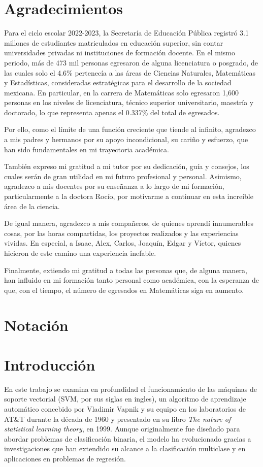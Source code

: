 \documentclass[letterpaper,12pt,oneside]{book}
\begin{document}
\chapter{Agradecimientos}
{Para el ciclo escolar 2022-2023, la Secretaría de Educación Pública registró 3.1 millones de estudiantes matriculados en educación superior, sin contar universidades privadas ni instituciones de formación docente. En el mismo periodo, más de 473 mil personas egresaron de alguna licenciatura o posgrado, de las cuales solo el 4.6\% pertenecía a las áreas de Ciencias Naturales, Matemáticas y Estadísticas, consideradas estratégicas para el desarrollo de la sociedad mexicana. En particular, en la carrera de Matemáticas solo egresaron 1,600 personas en los niveles de licenciatura, técnico superior universitario, maestría y doctorado, lo que representa apenas el 0.337\% del total de egresados.

Por ello, como el límite de una función creciente que tiende al infinito, agradezco a mis padres y hermanos por su apoyo incondicional, su cariño y esfuerzo, que han sido fundamentales en mi trayectoria académica.

También expreso mi gratitud a mi tutor por su dedicación, guía y consejos, los cuales serán de gran utilidad en mi futuro profesional y personal. Asimismo, agradezco a mis docentes por su enseñanza a lo largo de mi formación, particularmente a la doctora Rocío, por motivarme a continuar en esta increíble área de la ciencia.


De igual manera, agradezco a mis compañeros, de quienes aprendí innumerables cosas, por las horas compartidas, los proyectos realizados y las experiencias vividas. En especial, a Isaac, Alex, Carlos, Joaquín, Edgar y Víctor, quienes hicieron de este camino una experiencia inefable.


Finalmente, extiendo mi gratitud a todas las personas que, de alguna manera, han influido en mi formación tanto personal como académica, con la esperanza de que, con el tiempo, el número de egresados en Matemáticas siga en aumento.
}

\chapter{Notación}

\chapter{Introducción}
En este trabajo se examina en profundidad el funcionamiento de las máquinas de soporte vectorial (SVM, por sus siglas en ingles), un algoritmo de aprendizaje automático concebido por Vladimir Vapnik y su equipo en los laboratorios de AT\&T durante la década de 1960 y presentado en su libro \textit{The nature of statistical learning theory}, en 1999.  Aunque originalmente fue diseñado para abordar problemas de clasificación binaria, el modelo ha evolucionado gracias a investigaciones que han extendido su alcance a la clasificación multiclase y en aplicaciones en problemas de regresión.
\end{document}
